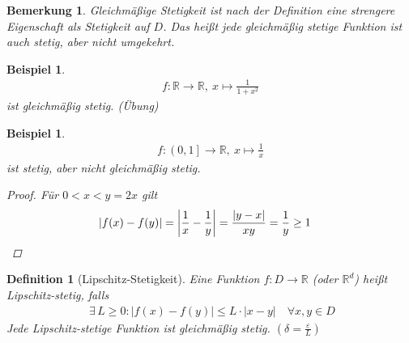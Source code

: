 \documentclass[11pt, twoside, a4paper]{article}
\theoremstyle{plain}
\newtheorem{bemerkung}[blockelement]{Bemerkung}
\newtheorem{definition}[blockelement]{Definition}
\newtheorem{beispiel}[blockelement]{Beispiel}
\newcommand{\abs}[1]{\left\lvert#1\right\rvert}
\newcommand{\rinterv}[1]{\left(#1\right]}
\newcommand{\fromto}{\rightarrow{}}
\newcommand{\ex}{\;\exists\,}
\newcommand{\R}{\mathbb{R}}
\begin{document}
    \begin{bemerkung}
        Gleichmäßige Stetigkeit ist nach der Definition eine strengere Eigenschaft als Stetigkeit auf $D$. Das heißt jede gleichmäßig stetige Funktion ist auch stetig, aber nicht umgekehrt.
    \end{bemerkung}

    \begin{beispiel}
        \begin{align*}
            f: \R\fromto\R,~x\mapsto\frac{1}{1+x^2}
        \end{align*}
        ist gleichmäßig stetig. (Übung)
    \end{beispiel}
    \begin{beispiel}
        \begin{align*}
            f: \rinterv{0,1}\fromto \R,~x\mapsto \frac{1}{x}
        \end{align*}
        ist stetig, aber nicht gleichmäßig stetig.
        \begin{proof}
            Für $0 < x < y = 2x$ gilt
            \begin{align*}
                \abs{f(x)-f(y)} &= \abs{\frac{1}{x} - \frac{1}{y}} = \frac{\abs{y-x}}{xy} = \frac{1}{y}\geq 1\qedhere
            \end{align*}
        \end{proof}
    \end{beispiel}

    \begin{definition}[Lipschitz-Stetigkeit]
        Eine Funktion $f: D\fromto\R$ (oder $\R^d$) heißt Lipschitz-stetig, falls
        \begin{align*}
            \ex L\geq 0\colon \abs{f(x)-f(y)} \leq L\cdot\abs{x-y}\quad\forall x,y\in D
        \end{align*}
        Jede Lipschitz-stetige Funktion ist gleichmäßig stetig. $(\delta = \frac{\varepsilon}{L})$
    \end{definition}
\end{document}
